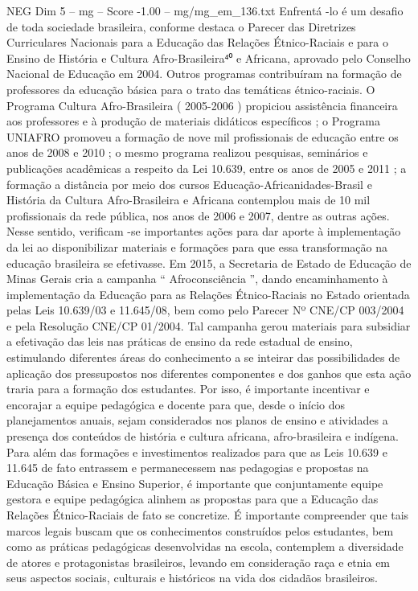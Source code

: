 \begin{textsample}{NEG Dim 5 – mg – Score -1.00 – mg/mg\_em\_136.txt}
Enfrentá -lo é um desafio de toda sociedade brasileira, conforme destaca o Parecer das Diretrizes Curriculares Nacionais para a Educação das Relações Étnico-Raciais e para o Ensino de História e Cultura Afro-Brasileira⁴⁰ e Africana, aprovado pelo Conselho Nacional de Educação em 2004.
Outros programas contribuíram na formação de professores da educação básica para o trato das temáticas étnico-raciais.
O Programa Cultura Afro-Brasileira ( 2005-2006 ) propiciou assistência financeira aos professores e à produção de materiais didáticos específicos ; o Programa UNIAFRO promoveu a formação de nove mil profissionais de educação entre os anos de 2008 e 2010 ; o mesmo programa realizou pesquisas, seminários e publicações acadêmicas a respeito da Lei 10.639, entre os anos de 2005 e 2011 ; a formação a distância por meio dos cursos Educação-Africanidades-Brasil e História da Cultura Afro-Brasileira e Africana contemplou mais de 10 mil profissionais da rede pública, nos anos de 2006 e 2007, dentre as outras ações.
Nesse sentido, verificam -se importantes ações para dar aporte à implementação da lei ao disponibilizar materiais e formações para que essa transformação na educação brasileira se efetivasse.
Em 2015, a Secretaria de Estado de Educação de Minas Gerais cria a campanha “ Afroconsciência ”, dando encaminhamento à implementação da Educação para as Relações Étnico-Raciais no Estado orientada pelas Leis 10.639/03 e 11.645/08, bem como pelo Parecer Nº CNE/CP 003/2004 e pela Resolução CNE/CP 01/2004.
Tal campanha gerou materiais para subsidiar a efetivação das leis nas práticas de ensino da rede estadual de ensino, estimulando diferentes áreas do conhecimento a se inteirar das possibilidades de aplicação dos pressupostos nos diferentes componentes e dos ganhos que esta ação traria para a formação dos estudantes.
Por isso, é importante incentivar e encorajar a equipe pedagógica e docente para que, desde o início dos planejamentos anuais, sejam considerados nos planos de ensino e atividades a presença dos conteúdos de história e cultura africana, afro-brasileira e indígena.
Para além das formações e investimentos realizados para que as Leis 10.639 e 11.645 de fato entrassem e permanecessem nas pedagogias e propostas na Educação Básica e Ensino Superior, é importante que conjuntamente equipe gestora e equipe pedagógica alinhem as propostas para que a Educação das Relações Étnico-Raciais de fato se concretize.
É importante compreender que tais marcos legais buscam que os conhecimentos construídos pelos estudantes, bem como as práticas pedagógicas desenvolvidas na escola, contemplem a diversidade de atores e protagonistas brasileiros, levando em consideração raça e etnia em seus aspectos sociais, culturais e históricos na vida dos cidadãos brasileiros.

\end{textsample}
